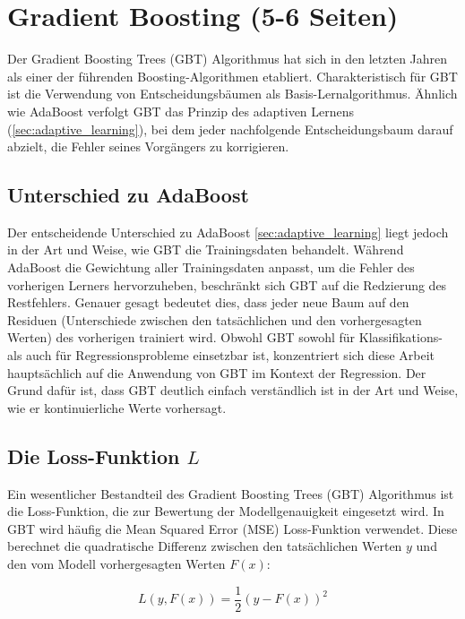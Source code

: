 \section{Gradient Boosting (5-6 Seiten)}
Der Gradient Boosting Trees (GBT) Algorithmus hat sich in den letzten Jahren als einer der führenden Boosting-Algorithmen etabliert. Charakteristisch für GBT ist die Verwendung von Entscheidungsbäumen als Basis-Lernalgorithmus. Ähnlich wie AdaBoost verfolgt GBT das Prinzip des adaptiven Lernens (\autoref{sec:adaptive_learning}), bei dem jeder nachfolgende Entscheidungsbaum darauf abzielt, die Fehler seines Vorgängers zu korrigieren.

\subsection{Unterschied zu AdaBoost}
Der entscheidende Unterschied zu AdaBoost \ref{sec:adaptive_learning} liegt jedoch in der Art und Weise, wie GBT die Trainingsdaten behandelt. Während AdaBoost die Gewichtung aller Trainingsdaten anpasst, um die Fehler des vorherigen Lerners hervorzuheben, beschränkt sich GBT auf die Redzierung des Restfehlers.
Genauer gesagt bedeutet dies, dass jeder neue Baum auf den Residuen (Unterschiede zwischen den tatsächlichen und den vorhergesagten Werten) des vorherigen trainiert wird.
\newline
Obwohl GBT sowohl für Klassifikations- als auch für Regressionsprobleme einsetzbar ist, konzentriert sich diese Arbeit hauptsächlich auf die Anwendung von GBT im Kontext der Regression. 
Der Grund dafür ist, dass GBT deutlich einfach verständlich ist in der Art und Weise, wie er kontinuierliche Werte vorhersagt.
\newline

\subsection{Die Loss-Funktion \( L \)}
Ein wesentlicher Bestandteil des Gradient Boosting Trees (GBT) Algorithmus ist die Loss-Funktion, die zur Bewertung der Modellgenauigkeit eingesetzt wird. In GBT wird häufig die Mean Squared Error (MSE) Loss-Funktion verwendet. Diese berechnet die quadratische Differenz zwischen den tatsächlichen Werten \( y \) und den vom Modell vorhergesagten Werten \( F(x) \):

\begin{equation}
    L(y, F(x)) = \frac{1}{2}(y - F(x))^2
\end{equation}

